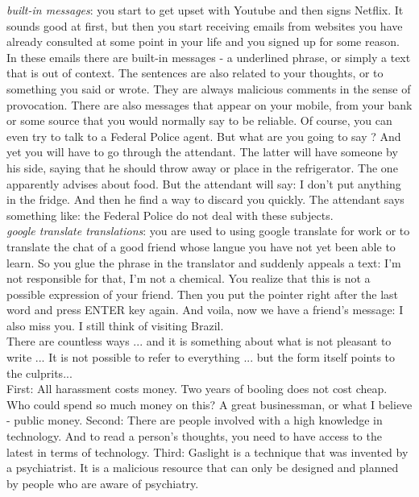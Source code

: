 \documentclass[11pt]{book}
\begin{document}
\emph{built-in messages}: you start to get upset with Youtube and then signs Netflix. It sounds good at first, but then you start receiving emails from websites you have already consulted at some point in your life and you signed up for some reason. In these emails there are built-in messages - a underlined phrase, or simply a text that is out of context. The sentences are also related to your thoughts, or to something you said or wrote. They are always malicious comments in the sense of provocation. There are also messages that appear on your mobile, from your bank or some source that you would normally say to be reliable. Of course, you can even try to talk to a Federal Police agent. But what are you going to say ? And yet you will have to go through the attendant. The latter will have someone by his side, saying that he should throw away or place in the refrigerator. The one apparently advises about food. But the attendant will say: I don't put anything in the fridge. And then he find a way to discard you quickly. The attendant says something like: the Federal Police do not deal with these subjects. \\
 
\emph{google translate translations}: you are used to using google translate for work or to translate the chat of a good friend whose langue you have not yet been able to learn. So you glue the phrase in the translator and suddenly appeals a text: I'm not responsible for that, I'm not a chemical. You realize that this is not a possible expression of your friend. Then you put the pointer right after the last word and press ENTER key again. And voila, now we have a friend's message: I also miss you. I still think of visiting Brazil. \\

\noindent There are countless ways ... and it is something about what is not pleasant to write ... It is not possible to refer to everything ... but the form itself points to the culprits... \\

\noindent First: All harassment costs money. Two years of booling does not cost cheap. Who could spend so much money on this? A great businessman, or what I believe - public money. Second: There are people involved with a high knowledge in technology. And to read a person's thoughts, you need to have access to the latest in terms of technology. Third: Gaslight is a technique that was invented by a psychiatrist. It is a malicious resource that can only be designed and planned by people who are aware of psychiatry. \\
\end{document}
